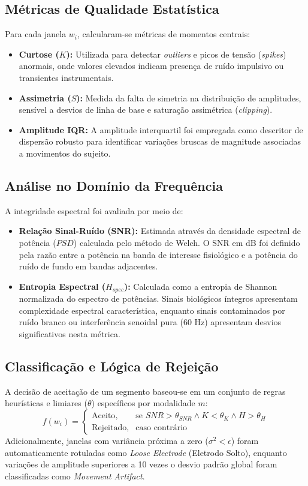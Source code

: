 \subsection{Métricas de Qualidade Estatística}
Para cada janela $w_i$, calcularam-se métricas de momentos centrais:
\begin{itemize}
    \item \textbf{Curtose ($K$):} Utilizada para detectar \textit{outliers} e picos de tensão (\textit{spikes}) anormais, onde valores elevados indicam presença de ruído impulsivo ou transientes instrumentais.
    \item \textbf{Assimetria ($S$):} Medida da falta de simetria na distribuição de amplitudes, sensível a desvios de linha de base e saturação assimétrica (\textit{clipping}).
    \item \textbf{Amplitude IQR:} A amplitude interquartil foi empregada como descritor de dispersão robusto para identificar variações bruscas de magnitude associadas a movimentos do sujeito.
\end{itemize}

\subsection{Análise no Domínio da Frequência}
A integridade espectral foi avaliada por meio de:
\begin{itemize}
    \item \textbf{Relação Sinal-Ruído (SNR):} Estimada através da densidade espectral de potência ($PSD$) calculada pelo método de Welch. O SNR em dB foi definido pela razão entre a potência na banda de interesse fisiológico e a potência do ruído de fundo em bandas adjacentes.
    \item \textbf{Entropia Espectral ($H_{spec}$):} Calculada como a entropia de Shannon normalizada do espectro de potências. Sinais biológicos íntegros apresentam complexidade espectral característica, enquanto sinais contaminados por ruído branco ou interferência senoidal pura (60 Hz) apresentam desvios significativos nesta métrica.
\end{itemize}

\subsection{Classificação e Lógica de Rejeição}
A decisão de aceitação de um segmento baseou-se em um conjunto de regras heurísticas e limiares ($\theta$) específicos por modalidade $m$:
\begin{equation}
    f(w_i) = 
    \begin{cases} 
    \text{Aceito}, & \text{se } SNR > \theta_{SNR} \land K < \theta_{K} \land H > \theta_{H} \\
    \text{Rejeitado}, & \text{caso contrário}
    \end{cases}
\end{equation}
Adicionalmente, janelas com variância próxima a zero ($\sigma^2 < \epsilon$) foram automaticamente rotuladas como \textit{Loose Electrode} (Eletrodo Solto), enquanto variações de amplitude superiores a 10 vezes o desvio padrão global foram classificadas como \textit{Movement Artifact}.

